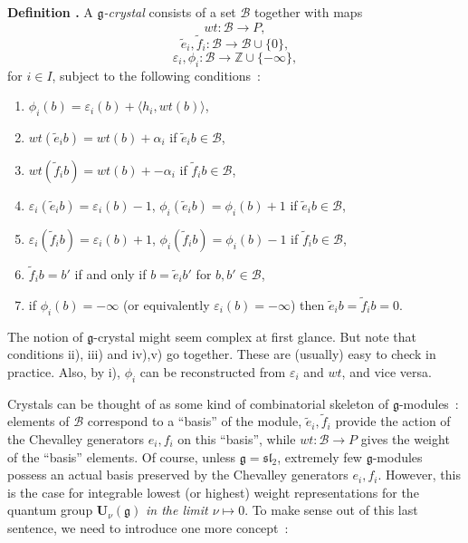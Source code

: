 \documentclass[a4paper,10pt]{amsart}
\def\Z{\mathbb{Z}}
\def\U{\mathbf{U}}
\def\g{\mathfrak{g}}
\numberwithin{equation}{section}
\begin{document}
\addtocounter{theo}{1}
\noindent \textbf{Definition \thetheo .} A \textit{$\g$-crystal} consists of a set $\mathcal{B}$ together with maps 
$$wt: \mathcal{B} \to P,$$
$$ \tilde{e}_i, \tilde{f}_i: \mathcal{B} \to \mathcal{B} \cup \{0\},$$
$$\varepsilon_i, \phi_i: \mathcal{B} \to \Z \cup \{-\infty\},$$
 for $i \in I$, subject to the following conditions~:
\begin{enumerate}
\item[i)] $\phi_i(b)=\varepsilon_i(b)+ \langle h_i, wt(b)\rangle$,
\item[ii)] $wt(\tilde{e}_ib)=wt(b)+\alpha_i$ if $\tilde{e}_ib \in \mathcal{B}$,
\item[iii)] $wt(\tilde{f}_ib)=wt(b)+-\alpha_i$ if $\tilde{f}_ib \in \mathcal{B}$,
\item[iv)] $\varepsilon_i(\tilde{e}_ib)=\varepsilon_i(b) -1$, $\phi_i(\tilde{e}_ib)=\phi_i(b) +1$ if $\tilde{e}_ib \in \mathcal{B}$,
\item[v)] $\varepsilon_i(\tilde{f}_ib)=\varepsilon_i(b)+1$, $\phi_i(\tilde{f}_ib)=\phi_i(b) -1$ if $\tilde{f}_ib \in \mathcal{B}$,
\item[vi)] $\tilde{f}_ib=b'$ if and only if $b=\tilde{e}_i b'$ for $b,b' \in \mathcal{B}$,
\item[vii)] if $\phi_i(b)=-\infty$ (or equivalently $\varepsilon_i(b)=-\infty$) then $\tilde{e}_ib=\tilde{f}_ib=0$.
\end{enumerate}

\vspace{.1in}

The notion of $\g$-crystal might seem complex at first glance. But note that conditions ii), iii) and iv),v) go together. These are (usually) easy to check in practice. Also, by i), $\phi_i$ can be reconstructed from $\varepsilon_i$ and $wt$, and vice versa.

\vspace{.1in}

Crystals can be thought of as some kind of combinatorial skeleton of $\g$-modules~: elements of $\mathcal{B}$ correspond to a ``basis'' of the module,  $\tilde{e}_i, \tilde{f}_i$ provide the action of the Chevalley generators $e_i, f_i$ on this ``basis'', while $wt: \mathcal{B} \to P$ gives the weight of the ``basis'' elements. 
Of course, unless $\g=\mathfrak{sl}_2$, extremely few $\g$-modules possess an actual basis preserved by the Chevalley generators $e_i,f_i$. However, this is the case for integrable lowest (or highest) weight representations for the quantum group $\U_\nu(\g)$ \textit{in the limit $\nu \mapsto 0$}. To make sense out of this last sentence, we need to introduce one more concept~: 
\end{document}
